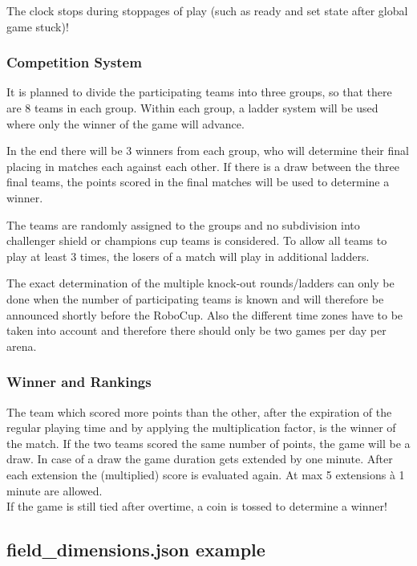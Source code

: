 The clock stops during stoppages of play (such as ready and set state after global game stuck)!

\subsubsection{Competition System}
It is planned to divide the participating teams into three groups, so that there are 8 teams in each group. Within each group, a ladder system will be used where only the winner of the game will advance. 

In the end there will be 3 winners from each group, who will determine their final placing in matches each against each other. If there is a draw between the three final teams, the points scored in the final matches will be used to determine a winner.

The teams are randomly assigned to the groups and no subdivision into challenger shield or champions cup teams is considered.
To allow all teams to play at least 3 times, the losers of a match will play in additional ladders.

The exact determination of the multiple knock-out rounds/ladders can only be done when the number of participating teams is known and will therefore be announced shortly before the RoboCup. Also the different time zones have to be taken into account and therefore there should only be two games per day per arena.
    
\subsubsection{Winner and Rankings}
\label{sec:rankings}

The team which scored more points than the other, after the expiration of the regular playing time and by applying the multiplication factor, is the winner of the match. If the two teams scored the same number of points, the game will be a draw. In case of a draw the game duration gets extended by one minute. After each extension the (multiplied) score is evaluated again. At max 5 extensions à 1 minute are allowed. \\
If the game is still tied after overtime, a coin is tossed to determine a winner!    

\subsection{field\_dimensions.json example}
\label{sec:fielddimensionsjson}

